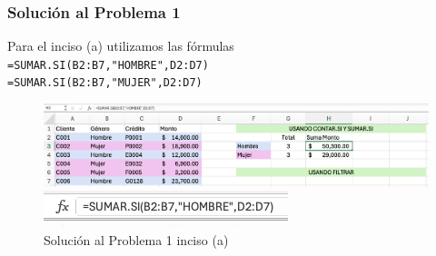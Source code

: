 \documentclass{article}
\begin{document}
\clearpage

\subsubsection*{Solución al Problema 1}

Para el inciso (a) utilizamos las fórmulas
\\[12pt]
\texttt{=SUMAR.SI(B2:B7,"HOMBRE",D2:D7)}
\\[0pt]
\texttt{=SUMAR.SI(B2:B7,"MUJER",D2:D7)}
\begin{figure}[!h]
    \centering
    \begin{minipage}{\textwidth}
        \centering
        \includegraphics[width=\textwidth]{figures/s101-1a1.png}
    \end{minipage}
    \hfill
    \begin{minipage}{\textwidth}
        \centering
        \includegraphics[width=\textwidth]{figures/s101-1a2.png}
    \end{minipage}
    \captionsetup{width=0.9\textwidth}
    \caption{Solución al Problema 1 inciso (a)}
    \label{fig:s101-1a}
\end{figure}
\end{document}
